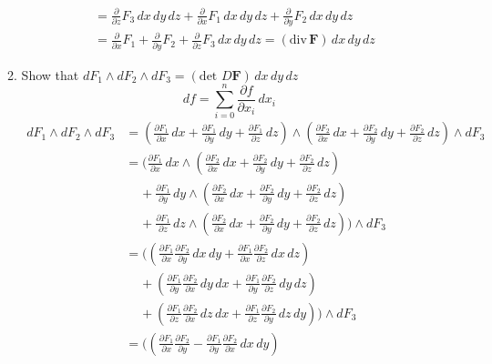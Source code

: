 \documentclass{article}
\newcommand{\parti}[1]{\frac{\partial}{\partial #1}}
\newcommand{\partis}[2]{\frac{\partial #2}{\partial #1}}
\newcommand{\divt}{\text{div} \,}
\begin{document}
\begin{enumerate}
\begin{enumerate}
\begin{align*}
                &= \parti{z} F_3  \, dx \, dy \, dz 
                + \parti{x} F_1 \,dx \, dy \, dz 
                + \parti{y} F_2 \, dx \, dy \, dz \\
                &= \parti{x} F_1 
                + \parti{y} F_2 
                + \parti{z} F_3 \, dx \, dy \, dz 
                = (\divt \boldsymbol F) \, dx \, dy \, dz
            \end{align*} 
        \newpage
        \item Show that $dF_1 \wedge dF_2 \wedge dF_3 
        = (\text{det } D \boldsymbol F ) \, dx \, dy \, dz$
            \[ df = \sum_{i=0}^{n} \partis{x_i}{f} \, dx_i \]
            \begin{align*} 
                dF_1 \wedge dF_2 \wedge dF_3 &= 
                (\partis{x}{F_1} \, dx 
                + \partis{y}{F_1} \, dy 
                + \partis{z}{F_1} \, dz) 
                \wedge (\partis{x}{F_2} \, dx 
                + \partis{y}{F_2} \, dy 
                + \partis{z}{F_2} \, dz) 
                \wedge dF_3 \\
                &= (\partis{x}{F_1} \, dx 
                \wedge (\partis{x}{F_2} \, dx 
                + \partis{y}{F_2} \, dy 
                + \partis{z}{F_2} \, dz) \\
                &\; \; \; \; 
                + \partis{y}{F_1} \, dy 
                \wedge (\partis{x}{F_2} \, dx 
                + \partis{y}{F_2} \, dy 
                + \partis{z}{F_2} \, dz) \\
                &\; \; \; \; 
                + \partis{z}{F_1} \, dz 
                \wedge (\partis{x}{F_2} \, dx 
                + \partis{y}{F_2} \, dy 
                + \partis{z}{F_2} \, dz) ) 
                \wedge dF_3 \\
                &= ((\partis{x}{F_1} \partis{y}{F_2} \, dx \, dy 
                + \partis{x}{F_1} \partis{z}{F_2} \, dx \, dz) \\
                &\; \; \; \; 
                + (\partis{y}{F_1} \partis{x}{F_2} \, dy \, dx 
                + \partis{y}{F_1} \partis{z}{F_2} \, dy \, dz) \\
                &\; \; \; \; 
                + (\partis{z}{F_1} \partis{x}{F_2} \, dz \, dx 
                + \partis{z}{F_1} \partis{y}{F_2} \, dz \, dy))
                \wedge dF_3 \\
                &= ((\partis{x}{F_1} \partis{y}{F_2} 
                - \partis{y}{F_1} \partis{x}{F_2}\, dx \, dy) \\

\end{align*}
\end{enumerate}
\end{enumerate}
\end{document}
